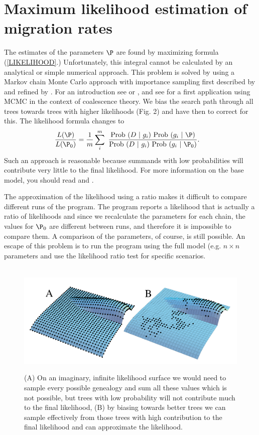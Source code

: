 \section{Maximum likelihood estimation of migration rates}
The estimates of the parameters $\P$ are found by maximizing formula (\ref{LIKELIHOOD}.)
Unfortunately, this integral cannot be calculated by an analytical or simple numerical approach. This problem is solved by using a Markov chain Monte Carlo approach with importance
sampling first described by \cite{Metropolis:1953:ESC} and refined by \cite{hastings1970-97}. For an introduction see \cite{Hammersley:1964:MCM}or \cite{chib:1995:umh}, 
and see \cite{kuhner1995-1421} for a first application using MCMC in the context of coalescence theory.
We bias the search path through all trees towards trees with higher likelihoods (Fig. 2)
and have then to correct for this. The likelihood formula changes to
\begin{align}
\frac{L(\P)}{L(\P_0)} &= \frac{1}{m}\sum_i^m\ \frac{ \prob(D\ |\ g_i)\ \prob( g_i\ |\ \P)}
{\prob(D\ |\ g_i)\ \prob( g_i\ |\ \P_0)}.
\end{align}
Such an approach is reasonable because summands with low probabilities
will contribute very little to the final likelihood. For more information on the base model, you should read \cite{beerli:1999:mle} and \cite{kuhner1995-1421}.

The approximation of the likelihood using a ratio makes it difficult to
compare different runs of the program. The program reports a likelihood
that is actually a ratio of likelihoods and since we recalculate the
parameters for each chain, the values for $\P_0$ are different
between runs, and therefore it is impossible to compare them. A comparison of the parameters, of course, is still possible.
An escape of this 
problem is to run the program using the full model (e.g. $n \times n$ parameters and use the likelihood ratio test for specific scenarios.

\begin{figure}[hbt]
\begin{center}
\leavevmode
\hbox{%
\includegraphics[scale=0.8]{mim/planes_orig}}
\end{center}
\caption{
(A) On an imaginary, infinite likelihood surface  we would need to sample every possible
genealogy and sum all these values which is not possible, but trees with low probability will not contribute much to the final likelihood,  (B) by biasing towards better trees we can sample effectively from those trees with high 
contribution to the final likelihood and can approximate the likelihood.
}
\label{FIG2}
\end{figure}
\vskip 1cm
